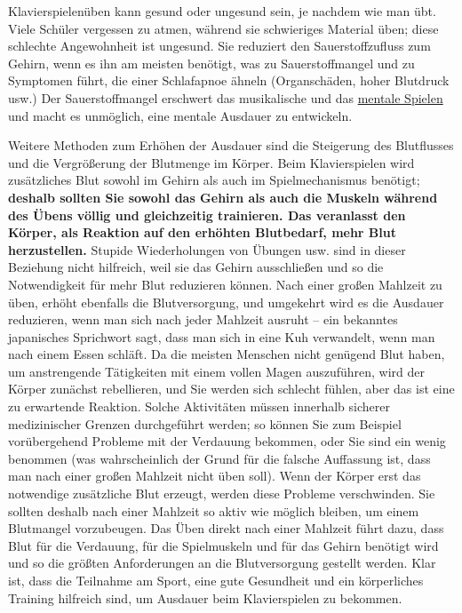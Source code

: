 Klavierspielenüben kann gesund oder ungesund sein, je nachdem wie man übt.
Viele Schüler vergessen zu atmen, während sie schwieriges Material üben; diese schlechte Angewohnheit ist ungesund.
Sie reduziert den Sauerstoffzufluss zum Gehirn, wenn es ihn am meisten benötigt, was zu Sauerstoffmangel und zu Symptomen führt, die einer Schlafapnoe ähneln (Organschäden, hoher Blutdruck usw.)
Der Sauerstoffmangel erschwert das musikalische und das \hyperref[c1ii12mental]{mentale Spielen} und macht es unmöglich, eine mentale Ausdauer zu entwickeln.

Weitere Methoden zum Erhöhen der Ausdauer sind die Steigerung des Blutflusses und die Vergrößerung der Blutmenge im Körper.
Beim Klavierspielen wird zusätzliches Blut sowohl im Gehirn als auch im Spielmechanismus benötigt; \textbf{deshalb sollten Sie sowohl das Gehirn als auch die Muskeln während des Übens völlig und gleichzeitig trainieren.
Das veranlasst den Körper, als Reaktion auf den erhöhten Blutbedarf, mehr Blut herzustellen.}
Stupide Wiederholungen von Übungen usw. sind in dieser Beziehung nicht hilfreich, weil sie das Gehirn ausschließen und so die Notwendigkeit für mehr Blut reduzieren können.
Nach einer großen Mahlzeit zu üben, erhöht ebenfalls die Blutversorgung, und umgekehrt wird es die Ausdauer reduzieren, wenn man sich nach jeder Mahlzeit ausruht -- ein bekanntes japanisches Sprichwort sagt, dass man sich in eine Kuh verwandelt, wenn man nach einem Essen schläft.
Da die meisten Menschen nicht genügend Blut haben, um anstrengende Tätigkeiten mit einem vollen Magen auszuführen, wird der Körper zunächst rebellieren, und Sie werden sich schlecht fühlen, aber das ist eine zu erwartende Reaktion.
Solche Aktivitäten müssen innerhalb sicherer medizinischer Grenzen durchgeführt werden; so können Sie zum Beispiel vorübergehend Probleme mit der Verdauung bekommen, oder Sie sind ein wenig benommen (was wahrscheinlich der Grund für die falsche Auffassung ist, dass man nach einer großen Mahlzeit nicht üben soll).
Wenn der Körper erst das notwendige zusätzliche Blut erzeugt, werden diese Probleme verschwinden.
Sie sollten deshalb nach einer Mahlzeit so aktiv wie möglich bleiben, um einem Blutmangel vorzubeugen.
Das Üben direkt nach einer Mahlzeit führt dazu, dass Blut für die Verdauung, für die Spielmuskeln und für das Gehirn benötigt wird und so die größten Anforderungen an die Blutversorgung gestellt werden.
Klar ist, dass die Teilnahme am Sport, eine gute Gesundheit und ein körperliches Training hilfreich sind, um Ausdauer beim Klavierspielen zu bekommen.

